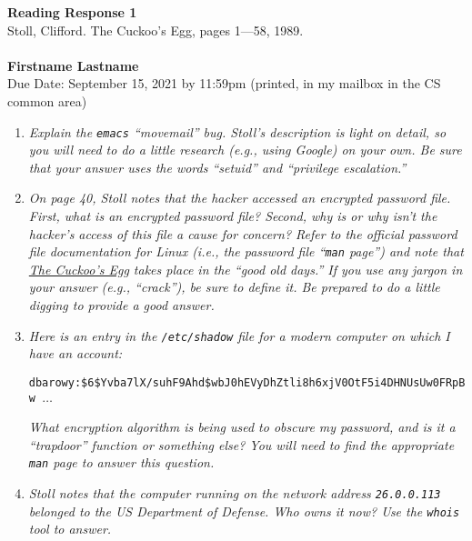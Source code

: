 \documentclass[11pt]{article}
\begin{document}

\noindent
\large\textbf{Reading Response 1} \\  
\normalsize Stoll, Clifford.  The Cuckoo's Egg, pages 1---58, 1989.
\\ \\
\textbf{Firstname Lastname} \\
\normalsize  Due Date: September 15, 2021 by 11:59pm (printed, in my mailbox in the CS common area)

\begin{enumerate}
	\item \emph{Explain the \texttt{emacs} ``movemail'' bug. Stoll’s description is light on detail, so you will need to do a little research (e.g., using Google) on your own. Be sure that your answer uses the words ``setuid'' and ``privilege escalation.''}
	
	
	\item \emph{On page 40, Stoll notes that the hacker accessed an encrypted password file. First, what is an encrypted password file? Second, why is or why isn’t the hacker’s access of this file a cause for concern? Refer to the official password file documentation for Linux (i.e., the password file ``\texttt{man} page'') and note that \underline{The Cuckoo’s Egg} takes place in the “good old days.” If you use any jargon in your answer (e.g., ``crack''), be sure to define it. Be prepared to do a little digging to provide a good answer.}
	

	\item \emph{Here is an entry in the \texttt{/etc/shadow} file for a modern computer on which I have an account:}

	\begin{sloppypar}
	\texttt{dbarowy:\$6\$Yvba7lX/suhF9Ahd\$wbJ0hEVyDhZtli8h6xjV0OtF5i4DHNUsUw0FRpBw $\ldots$}
	\end{sloppypar}


	\emph{What encryption algorithm is being used to obscure my password, and is it a ``trapdoor'' function or something else? You will need to find the appropriate \texttt{man} page to answer this question.}
	
	
	\item \emph{Stoll notes that the computer running on the network address \texttt{26.0.0.113} belonged to the US Department of Defense. Who owns it now? Use the \texttt{whois} tool to answer.}


\end{enumerate}
\end{document}
